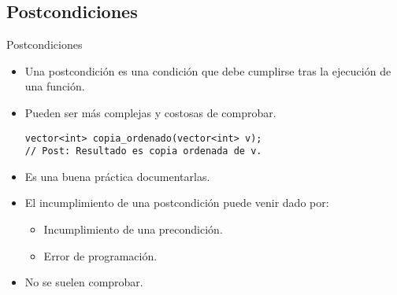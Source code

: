 \subsection{Postcondiciones}

\begin{frame}[fragile]{Postcondiciones}
\begin{itemize}
  \item Una \alert{postcondición} es una condición que debe cumplirse tras
        la ejecución de una función.
  \item Pueden ser más complejas y costosas de comprobar.
\begin{lstlisting}
vector<int> copia_ordenado(vector<int> v);
// Post: Resultado es copia ordenada de v.
\end{lstlisting}
  \item Es una buena práctica documentarlas.
  \item El incumplimiento de una postcondición puede venir dado por:
    \begin{itemize}
      \item Incumplimiento de una precondición.
      \item Error de programación.
    \end{itemize}
  \item No se suelen comprobar.
\end{itemize}
\end{frame}
